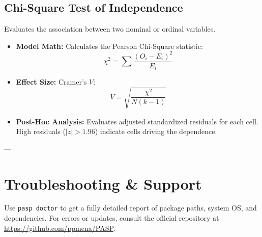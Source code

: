 \documentclass[a4paper,11pt,oneside]{article}
\begin{document}
\subsection{Chi-Square Test of Independence}
Evaluates the association between two nominal or ordinal variables.
\begin{itemize}
    \item \textbf{Model Math:} Calculates the Pearson Chi-Square statistic:
    \begin{equation}
    \chi^2 = \sum \frac{(O_i - E_i)^2}{E_i}
    \end{equation}
    \item \textbf{Effect Size:} Cramer's $V$:
    \begin{equation}
    V = \sqrt{\frac{\chi^2}{N(k - 1)}}
    \end{equation}
    \item \textbf{Post-Hoc Analysis:} Evaluates adjusted standardized residuals for each cell. High residuals ($|z| > 1.96$) indicate cells driving the dependence.
\end{itemize}

---

\section{Troubleshooting \& Support}
Use \texttt{pasp doctor} to get a fully detailed report of package paths, system OS, and dependencies. For errors or updates, consult the official repository at \url{https://github.com/ppmena/PASP}.
\end{document}
